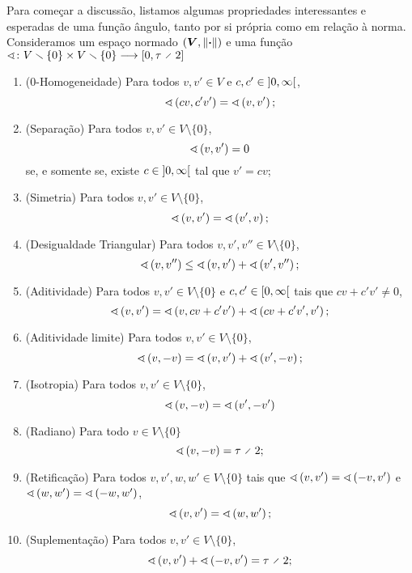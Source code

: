 Para começar a discussão, listamos algumas propriedades interessantes e esperadas de uma função ângulo, tanto por si própria como em relação à norma. Consideramos um espaço normado $(\bm V, \left\Vert{\bm{\cdot}}\right\Vert)$ e uma função $\fun{\angf}{V \setminus \{0\} \times V \setminus \{0\}}{\intff{0}{\tau \div 2}}$
	\begin{enumerate}
		\item ($0$-Homogeneidade) Para todos $v,v' \in V$ e $c,c' \in \left]{0},{\infty}\right[$,
			\begin{equation*}
				\sphericalangle\left({cv},{c'v'}\right) = \sphericalangle\left({v},{v'}\right);
			\end{equation*}
		\item (Separação) Para todos $v,v' \in V \setminus \{0\}$,
			\begin{equation*}
				\sphericalangle\left({v},{v'}\right) = 0
			\end{equation*}
		se, e somente se, existe $c \in \left]{0},{\infty}\right[$ tal que $v'=cv$;
		\item (Simetria) Para todos $v,v' \in V \setminus \{0\}$,
			\begin{equation*}
				\sphericalangle\left({v},{v'}\right) = \sphericalangle\left({v'},{v}\right);
			\end{equation*}
		\item (Desigualdade Triangular) Para todos $v,v',v'' \in V \setminus \{0\}$,
			\begin{equation*}
				\sphericalangle\left({v},{v''}\right) \leq \sphericalangle\left({v},{v'}\right) + \sphericalangle\left({v'},{v''}\right);
			\end{equation*}

		\item (Aditividade) Para todos $v,v' \in V \setminus \{0\}$ e $c,c' \in \left[{0},{\infty}\right[$ tais que $cv+c'v' \neq 0$,
			\begin{equation*}
				\sphericalangle\left({v},{v'}\right) = \sphericalangle\left({v},{cv+c'v'}\right) + \sphericalangle\left({cv+c'v'},{v'}\right);
			\end{equation*}
		\item (Aditividade limite) Para todos $v,v' \in V \setminus \{0\}$,
		\begin{equation*}
			\sphericalangle\left({v},{-v}\right) = \sphericalangle\left({v},{v'}\right) + \sphericalangle\left({v'},{-v}\right);
		\end{equation*}

		\item (Isotropia) Para todos $v,v' \in V \setminus \{0\}$,
			\begin{equation*}
				\sphericalangle\left({v},{-v}\right) = \sphericalangle\left({v'},{-v'}\right)
			\end{equation*}
		\item (Radiano) Para todo $v \in V \setminus \{0\}$
			\begin{equation*}
				\ang{v}{-v} = \tau \div 2;
			\end{equation*}
		\item (Retificação) Para todos $v,v',w,w' \in V \setminus \{0\}$ tais que $\sphericalangle\left({v},{v'}\right) = \sphericalangle\left({-v},{v'}\right)$ e $\sphericalangle\left({w},{w'}\right) = \sphericalangle\left({-w},{w'}\right)$,
			\begin{equation*}
				\sphericalangle\left({v},{v'}\right) = \sphericalangle\left({w},{w'}\right);
			\end{equation*}
		\item (Suplementação) Para todos $v,v' \in V \setminus \{0\}$,
			\begin{equation*}
				\ang{v}{v'} + \ang{-v}{v'} = \tau \div 2;
			\end{equation*}


\end{enumerate}
